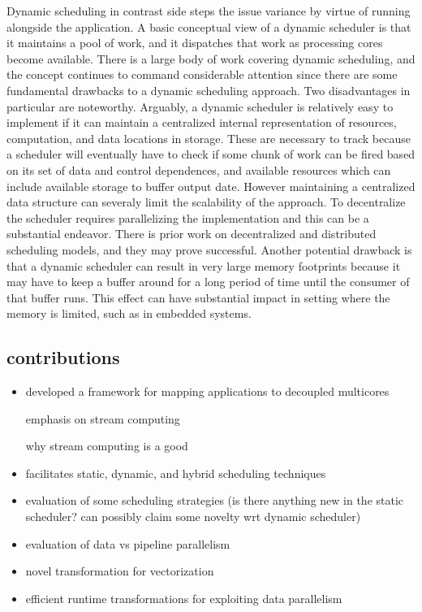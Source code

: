 Dynamic scheduling in contrast side steps the issue variance by virtue
of running alongside the application. A basic conceptual view of a
dynamic scheduler is that it maintains a pool of work, and it
dispatches that work as processing cores become available. There is a
large body of work covering dynamic scheduling, and the concept
continues to command considerable attention since there are some
fundamental drawbacks to a dynamic scheduling approach. Two
disadvantages in particular are noteworthy. Arguably, a dynamic
scheduler is relatively easy to implement if it can maintain a
centralized internal representation of resources, computation, and
data locations in storage. These are necessary to track because a
scheduler will eventually have to check if some chunk of work can be
fired based on its set of data and control dependences, and available
resources which can include available storage to buffer output date.
However maintaining a centralized data structure can severaly limit
the scalability of the approach. To decentralize the scheduler
requires parallelizing the implementation and this can be a
substantial endeavor. There is prior work on decentralized and
distributed scheduling models, and they may prove successful.
Another potential drawback is that a dynamic scheduler can result in
very large memory footprints because it may have to keep a buffer
around for a long period of time until the consumer of that buffer
runs. This effect can have substantial impact in setting where the
memory is limited, such as in embedded systems.

\subsection{contributions}

\begin{itemize}

\item developed a framework for mapping applications to decoupled multicores

emphasis on stream computing

why stream computing is a good 

\item facilitates static, dynamic, and hybrid scheduling techniques

\item evaluation of some scheduling strategies (is there anything new in the
static scheduler? can possibly claim some novelty wrt dynamic scheduler)

\item evaluation of data vs pipeline parallelism

\item novel transformation for vectorization

\item efficient runtime transformations for exploiting data parallelism

\end{itemize}

